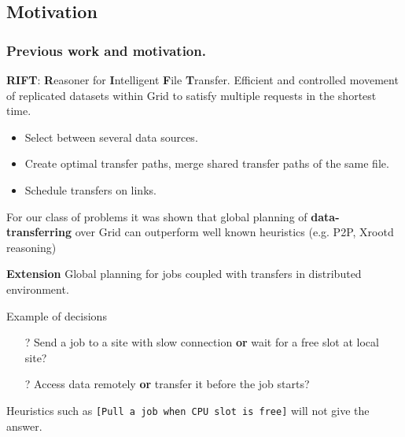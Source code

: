\documentclass{beamer}
\begin{document}
\subsection{Motivation}
\begin{frame}\frametitle{Previous work and motivation.}
\begin{footnotesize}
\begin{block}{\textbf{RIFT}: \textbf{R}easoner for \textbf{I}ntelligent \textbf{F}ile \textbf{T}ransfer.}
Efficient and controlled movement of replicated datasets within Grid to satisfy multiple requests in the shortest time. \cite{Zerola}
 \begin{itemize}
\item Select between several data sources. 
\item Create optimal transfer paths, merge shared transfer paths of the same file.
\item Schedule transfers on links.
\end{itemize} 
For our class of problems it was shown that global planning of \textbf{data-transferring} over Grid can outperform well known heuristics (e.g. P2P, Xrootd reasoning)
\end{block}  
 		\begin{block}{\textbf{Extension}}
Global planning for jobs coupled with transfers in distributed environment.
 	\end{block} 	
\vspace{-2mm}
\begin{block}{Example of decisions} 
		\begin{itemize}
			\item[?] Send a job to a site with slow connection \textbf{or} wait for a free slot at local site?
		\item[?] Access data remotely \textbf{or} transfer it before the job starts?	
		\end{itemize}
\vspace{-2mm}		
Heuristics such as  \texttt{[Pull a job when CPU slot is free]} will not give the answer.

\end{block}  	 	
\end{footnotesize} 	
\end{frame}
\end{document}
